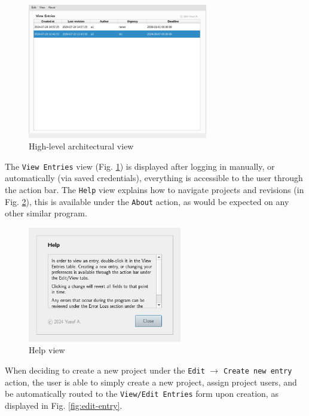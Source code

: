 \documentclass{report}
\begin{document}
	\begin{figure}[h]
		\centering
		\includegraphics[width=0.7\textwidth]{view-entries}
		\caption{High-level architectural view}
		\label{fig:view_entries}
	\end{figure}
	
	The \verb|View Entries| view (Fig. \ref{fig:view_entries}) is displayed after logging in manually, or automatically
	(via saved credentials), everything is accessible to the user through the action bar. The \verb|Help| view explains
	how to navigate projects and revisions (in Fig. \ref{fig:help}), this is available under the \verb|About| action, as
	would be expected on any other similar program.

	\begin{figure}[h]
		\centering
		\includegraphics[width=0.6\textwidth]{help}
		\caption{Help view}
		\label{fig:help}
	\end{figure}
	
	When deciding to create a new project under the \verb|Edit| $\rightarrow$ \verb|Create new entry| action, the
	user is able to simply create a new project, assign project users, and be automatically routed to the
	\verb|View/Edit Entries| form upon creation, as displayed in Fig. \ref{fig:edit-entry}.
\end{document}
